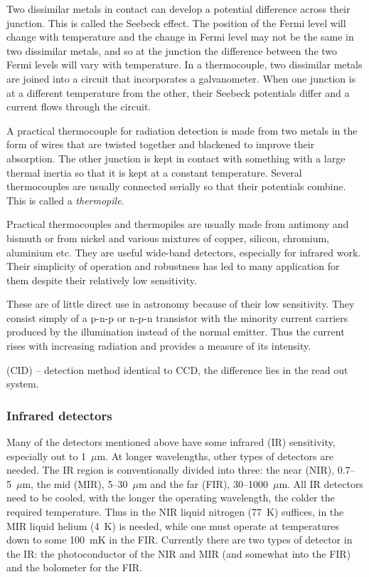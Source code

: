  Two dissimilar metals in contact can
develop a potential difference across their junction. This is called
the Seebeck effect. The position of the Fermi level will change with
temperature and the change in Fermi level may not be the same in two
dissimilar metals, and so at the junction the difference between the
two Fermi levels will vary with temperature. In a thermocouple, two
dissimilar metals are joined into a circuit that incorporates a
galvanometer. When one junction is at a different temperature from the
other, their Seebeck potentials differ and a current flows through the
circuit. 

A practical thermocouple for radiation detection is made from two
metals in the form of wires that are twisted together and blackened to
improve their absorption. The other junction is kept in contact with
something with a large thermal inertia so that it is kept at a
constant temperature. Several thermocouples are usually connected
serially so that their potentials combine. This is called a {\it
  thermopile}.

Practical thermocouples and thermopiles are usually made from antimony
and bismuth or from nickel and various mixtures of copper, silicon,
chromium, aluminium etc. They are useful wide-band detectors,
especially for infrared work. Their simplicity of operation and
robustness has led to many application for them despite their
relatively low sensitivity.

 These are of little direct use in
astronomy because of their low sensitivity. They consist simply of a
p-n-p or n-p-n transistor with the minority current carriers produced
by the illumination instead of the normal emitter. Thus the current
rises with increasing radiation and provides a measure of its intensity.

 (CID) -- detection method identical to CCD, 
the difference lies in the read out system. 

\subsubsection{Infrared detectors}

Many of the detectors mentioned above have some infrared (IR) sensitivity, 
especially out to 1~$\mu$m. At longer wavelengths, other types of detectors
are needed. The IR region is conventionally divided into three: the near
(NIR), 0.7--5~$\mu$m, the mid (MIR), 5--30~$\mu$m and the far (FIR), 
30--1000~$\mu$m. All IR detectors need to be cooled, with the longer the
operating wavelength, the colder the required temperature. Thus in the 
NIR liquid nitrogen (77~K) suffices, in the MIR liquid helium (4~K) is 
needed, while one must operate at temperatures down to some 100~mK in the 
FIR. Currently there are two types of detector in the IR: the photoconductor
of the NIR and MIR (and somewhat into the FIR) and the bolometer for the
FIR.

